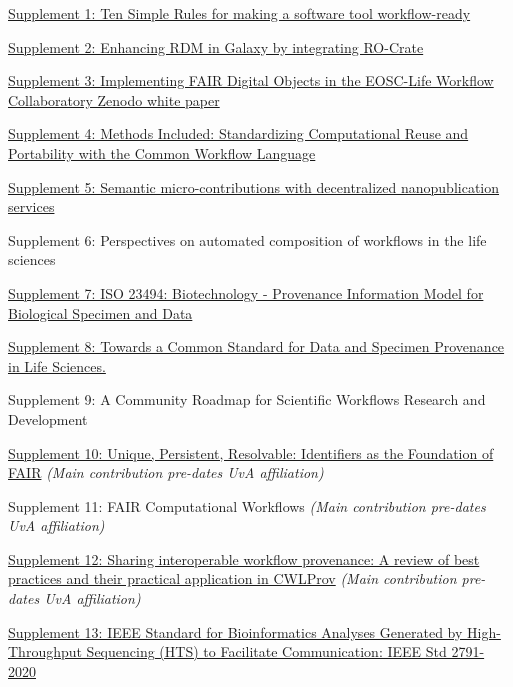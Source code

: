 \href{https://s11.no/2022/phd/10-simple-rules-for-workflow-tools/}{Supplement 1: Ten Simple
Rules for making a software tool workflow-ready} \cite{ch6-37}

\href{https://s11.no/2022/phd/galaxy-ro-crate/}{Supplement 2: Enhancing RDM in Galaxy by
integrating RO-Crate} \cite{De Geest 2022}

\href{https://s11.no/2021/phd/workflow-collaboratory//}{Supplement 3: Implementing FAIR
Digital Objects in the EOSC-Life Workflow Collaboratory Zenodo white
paper} \cite{Goble 2021}

\href{https://s11.no/2022/phd/methods-included/}{Supplement 4: Methods Included:
Standardizing Computational Reuse and Portability with the Common
Workflow Language} \cite{Crusoe 2022}

\href{https://s11.no/2021/phd/nanopub/}{Supplement 5: Semantic micro-contributions
with decentralized nanopublication services} \cite{Kuhn 2021}

Supplement 6:
Perspectives on automated composition of workflows in the life sciences \cite{lamprechtPerspectivesAutomatedComposition2021b}

\href{https://doi.org/10.1007/978-3-030-80960-7_16}{Supplement 7: ISO
23494: Biotechnology - Provenance Information Model for Biological
Specimen and Data}

\href{https://doi.org/10.1002/lrh2.10365}{Supplement 8: Towards a
Common Standard for Data and Specimen Provenance in Life Sciences.}

Supplement 9: A Community Roadmap for Scientific Workflows Research and Development \cite{ch6-39}

\href{https://doi.org/10.1162/dint_a_00025}{Supplement 10: Unique,
Persistent, Resolvable: Identifiers as the Foundation of FAIR} 
\emph{(Main contribution pre-dates UvA affiliation)}

Supplement 11: FAIR Computational Workflows \cite{Goble 2020} \emph{(Main contribution pre-dates UvA
affiliation)} 

\href{https://doi.org/10.1093/gigascience/giz095}{Supplement 12: Sharing
interoperable workflow provenance: A review of best practices and their
practical application in CWLProv} \cite{ch5-68} \emph{(Main contribution pre-dates UvA
affiliation)} 

\href{https://www.research.manchester.ac.uk/portal/en/publications/ieee-2791(936de52b-ac53-4f0e-9927-77fd7073e88d).html}{Supplement
13: IEEE Standard for Bioinformatics Analyses Generated by
High-Throughput Sequencing (HTS) to Facilitate Communication: IEEE Std
2791-2020} \cite{ch5-64}



